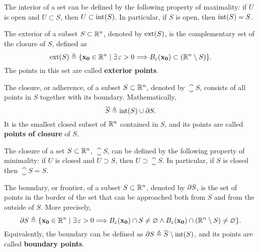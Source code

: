 \begin{note}
    The interior of a set can be defined by the following property of maximality: if $U$ is open and $U\subset S$, then
    $U\subset\interior{S}$. In particular, if $S$ is open, then $\interior{S} = S$.
\end{note}

\begin{defn}[Exterior]
	The exterior of a subset $S\subset\Rtn$, denoted by $\exterior{S}$, is the complementary set of the closure of $S$, defined as
	\begin{equation}
		\exterior{S}\bydef\{\vec{x_0}\in\Rtn\st\exists\epsilon > 0\implies B_\epsilon\argopen(\vec{x_0}\argclose)\subset
		\left(\Rtn\setminus S\right)\}.
	\end{equation}
	The points in this set are called \textbf{exterior points}.
\end{defn}

\begin{defn}[Closure]
    The closure, or adherence, of a subset $S\subset\Rtn$, denoted by $\closure{S}$, consists of all points in $S$ 
    together with its boundary. Mathematically, 
    \begin{equation}
        \closure{S}\bydef\interior{S}\cup\frontier{S}.
    \end{equation}
    It is the smallest closed subset of $\Rtn$ contained in $S$, and its points are called \textbf{points of closure} of $S$.
\end{defn}

\begin{note}
    The closure of a set $S\subset\Rtn$, $\closure{S}$, can be defined by the following property of minimality: if $U$ is
    closed and $U\supset S$, then $U\supset\closure{S}$. In particular, if $S$ is closed then $\closure{S} = S$.
\end{note}

\begin{defn}[Boundary]
	The boundary, or frontier, of a subset $S\subset\Rtn$, denoted by $\partial S$, is the set of points in the border 
        of the set that can be approached both from $S$ and from the outside of $S$. More precisely, 
	\begin{equation}
		\frontier{S}\bydef\{\vec{x_0}\in\Rtn\st\exists\epsilon > 0\implies B_\epsilon
		\argopen(\vec{x_0}\argclose)\cap S\neq\O\land B_\epsilon\argopen(\vec{x_0}\argclose)\cap\left(\Rtn\setminus S\right)
		\neq\O\}.
	\end{equation}
	Equivalently, the boundary can be defined as $\frontier{S}\bydef\closure{S}\setminus\interior{S}$, and its points are called
	\textbf{boundary points}.
\end{defn}

